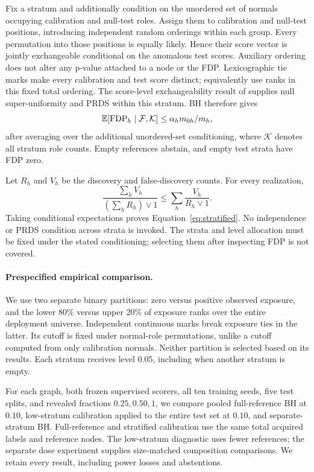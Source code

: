 Fix a stratum and additionally condition on the unordered set of normals occupying calibration and null-test roles. Assign them to calibration and null-test positions, introducing independent random orderings within each group. Every permutation into those positions is equally likely. Hence their score vector is jointly exchangeable conditional on the anomalous test scores. Auxiliary ordering does not alter any p-value attached to a node or the FDP. Lexicographic tie marks make every calibration and test score distinct; equivalently use ranks in this fixed total ordering. The score-level exchangeability result of \citet[Theorem 3.3]{marandon2024adaptive} supplies null super-uniformity and PRDS within this stratum. BH therefore gives
\[
\mathbb{E}[\operatorname{FDP}_h\mid\mathcal F,\mathcal K]
\le\alpha_h m_{0h}/m_h,
\]
after averaging over the additional unordered-set conditioning, where $\mathcal K$ denotes all stratum role counts. Empty references abstain, and empty test strata have FDP zero.

Let $R_h$ and $V_h$ be the discovery and false-discovery counts. For every realization,
\[
\frac{\sum_h V_h}{(\sum_h R_h)\vee1}
\le\sum_h\frac{V_h}{R_h\vee1}.
\]
Taking conditional expectations proves Equation~\eqref{eq:stratified}. No independence or PRDS condition across strata is invoked. The strata and level allocation must be fixed under the stated conditioning; selecting them after inspecting FDP is not covered.

\paragraph{Prespecified empirical comparison.}
We use two separate binary partitions: zero versus positive observed exposure, and the lower 80\% versus upper 20\% of exposure ranks over the entire deployment universe. Independent continuous marks break exposure ties in the latter. Its cutoff is fixed under normal-role permutations, unlike a cutoff computed from only calibration normals. Neither partition is selected based on its results. Each stratum receives level $0.05$, including when another stratum is empty.

For each graph, both frozen supervised scorers, all ten training seeds, five test splits, and revealed fractions $0.25,0.50,1$, we compare pooled full-reference BH at $0.10$, low-stratum calibration applied to the entire test set at $0.10$, and separate-stratum BH. Full-reference and stratified calibration use the same total acquired labels and reference nodes. The low-stratum diagnostic uses fewer references; the separate dose experiment supplies size-matched composition comparisons. We retain every result, including power losses and abstentions.

